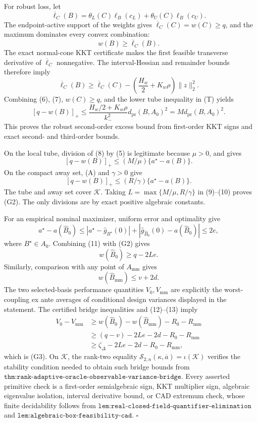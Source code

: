 For robust loss, let
\[
\overline\ell_C(B)
=\theta_L(C)\ell_B(c_L)+\theta_U(C)\ell_B(c_U).
\]
The endpoint-active support of the weights gives \(\overline\ell_C(C)=w(C)\ge q\), and the maximum dominates every convex combination:
\[
w(B)\ge\overline\ell_C(B).
\tag{6}
\]
The exact normal-cone KKT certificate makes the first feasible transverse derivative of \(\overline\ell_C\) nonnegative.  The interval-Hessian and remainder bounds therefore imply
\[
\overline\ell_C(B)
\ge\overline\ell_C(C)
-\left(\frac{H_w}{2}+K_w\rho\right)\lVert z\rVert_2^2.
\tag{7}
\]
Combining (6), (7), \(w(C)\ge q\), and the lower tube inequality in (T) yields
\[
[q-w(B)]_+
\le \frac{H_w/2+K_w\rho}{k_-^2}
d_{\mathrm{pr}}(B,A_0)^2
=M d_{\mathrm{pr}}(B,A_0)^2.
\tag{8}
\]
This proves the robust second-order excess bound from first-order KKT signs and exact second- and third-order bounds.

On the local tube, division of (8) by (5) is legitimate because \(\mu>0\), and gives
\[
[q-w(B)]_+\le(M/\mu)\{a^\star-a(B)\}.
\tag{9}
\]
On the compact away set, (A) and \(\gamma>0\) give
\[
[q-w(B)]_+\le(R/\gamma)\{a^\star-a(B)\}.
\tag{10}
\]
The tube and away set cover \(\mathcal K\).  Taking \(L=\max\{M/\mu,R/\gamma\}\) in (9)--(10) proves (G2).  The only divisions are by exact positive algebraic constants.

For an empirical nominal maximizer, uniform error and optimality give
\[
a^\star-a(\widehat B_0)
\le |a^\star-\widehat g_{B^\star}(0)|
+|\widehat g_{\widehat B_0}(0)-a(\widehat B_0)|
\le2e,
\tag{11}
\]
where \(B^\star\in A_0\).  Combining (11) with (G2) gives
\[
w(\widehat B_0)\ge q-2Le.
\tag{12}
\]
Similarly, comparison with any point of \(A_{\mathrm{mm}}\) gives
\[
w(\widehat B_{\mathrm{mm}})\le v+2d.
\tag{13}
\]
The two selected-basis performance quantities \(V_0,V_{\mathrm{mm}}\) are explicitly the worst-coupling ex ante averages of conditional design variances displayed in the statement.  The certified bridge inequalities and (12)--(13) imply
\[
\begin{aligned}
V_0-V_{\mathrm{mm}}
&\ge w(\widehat B_0)-w(\widehat B_{\mathrm{mm}})-R_0-R_{\mathrm{mm}}\\
&\ge(q-v)-2Le-2d-R_0-R_{\mathrm{mm}}\\
&\ge\zeta_\Delta-2Le-2d-R_0-R_{\mathrm{mm}},
\end{aligned}
\]
which is (G3).  On \(\mathcal K\), the rank-two equality \(\mathcal S_{2,n}(\kappa,\overline a)=\iota(\mathcal K)\) verifies the stability condition needed to obtain such bridge bounds from \(\texttt{thm:rank-adaptive-oracle-observable-variance-bridge}\).  Every asserted primitive check is a first-order semialgebraic sign, KKT multiplier sign, algebraic eigenvalue isolation, interval derivative bound, or CAD extremum check, whose finite decidability follows from \(\texttt{lem:real-closed-field-quantifier-elimination}\) and \(\texttt{lem:algebraic-box-feasibility-cad}\). \(\square\)